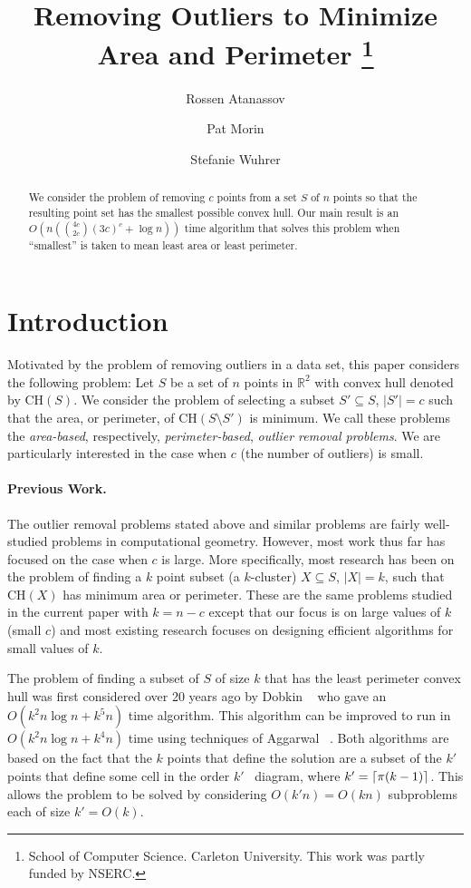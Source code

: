 \documentclass[lotsofwhite]{patmorin}
\title{
\vc{\MakeUppercase{Removing Outliers to Minimize Area and Perimeter}}
{Removing Outliers to Minimize Area and Perimeter}%
\thanks{School of Computer Science. Carleton University. This work was partly funded by NSERC.}}
\author{Rossen Atanassov \and
	Pat Morin \and
	Stefanie Wuhrer}
\date{}
\newcommand{\ch}{\mathrm{CH}}
\newcommand{\runtime}{n\left({4c\choose 2c}(3c)^c + \log n\right)}
\newcommand{\Oruntime}{O\left(\runtime\right)}
\begin{document}
\maketitle

\begin{abstract}
We consider the problem of removing $c$ points from a set $S$ of $n$
points so that the resulting point set has the smallest possible
convex hull.  Our main result is an $\Oruntime$ time algorithm
that solves this problem when ``smallest'' is taken to mean least area
or least perimeter.
\end{abstract}

\section{Introduction}

Motivated by the problem of removing outliers in a data set, this
paper considers the following problem: Let $S$ be a set of $n$ points
in $\mathbb{R}^2$ with convex hull denoted by $\ch(S)$.  We consider
the problem of selecting a subset $S'\subseteq S$, $|S'|=c$ such that
the area, or perimeter, of $\ch(S\setminus S')$ is minimum.  We call
these problems the \emph{area-based}, respectively,
\emph{perimeter-based}, \emph{outlier removal problems}.  We are
particularly interested in the case when $c$ (the number of outliers)
is small.

\vspace{-3mm}
\paragraph{Previous Work.} 

The outlier removal problems stated above and similar problems are
fairly well-studied problems in computational geometry.  However, most
work thus far has focused on the case when $c$ is large. More
specifically, most research has been on the problem of finding a $k$
point subset (a $k$-cluster) $X\subseteq S$, $|X|=k$, such that
$\ch(X)$ has minimum area or perimeter. These are the same problems
studied in the current paper with $k=n-c$ except that our focus is on
large values of $k$ (small $c$) and most existing research focuses on
designing efficient algorithms for small values of $k$.

The problem of finding a subset of $S$ of size $k$ that has the least
perimeter convex hull was first considered over 20 years ago by Dobkin
\etal\ \cite{ddg83} who gave an $O(k^2n\log n + k^5 n)$ time
algorithm.  This algorithm can be improved to run in $O(k^2 n\log n +
k^4 n)$ time using techniques of Aggarwal \etal\ \cite{aiks89}.  Both
algorithms are based on the fact that the $k$ points that define the
solution are a subset of the $k'$ points that define some cell in the
order $k'$ \voronoi\ diagram, where $k'=\left\lceil \pi (k-1) \right\rceil$.  This
allows the problem to be solved by considering $O(k'n)=O(kn)$ subproblems
each of size $k'=O(k)$.
\end{document}
